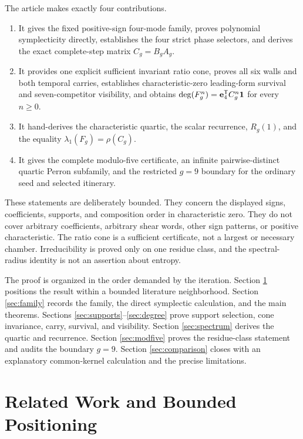 \documentclass[11pt]{article}
\theoremstyle{remark}
\numberwithin{equation}{section}
\begin{document}
The article makes exactly four contributions.
\begin{enumerate}[label=\textup{(\arabic*)}]
\item It gives the fixed positive-sign four-mode family, proves polynomial
symplecticity directly, establishes the four strict phase selectors, and
derives the exact complete-step matrix \(C_g=B_gA_g\).
\item It provides one explicit sufficient invariant ratio cone, proves all
six walls and both temporal carries, establishes characteristic-zero
leading-form survival and seven-competitor visibility, and obtains
\(\deg(F_g^n)=\mathbf{e}_4^{\mathsf{T}}C_g^n\mathbf{1}\) for every \(n\geq0\).
\item It hand-derives the characteristic quartic, the scalar recurrence,
\(R_g(1)\), and the equality \(\lambda_1(F_g)=\rho(C_g)\).
\item It gives the complete modulo-five certificate, an infinite
pairwise-distinct quartic Perron subfamily, and the restricted \(g=9\)
boundary for the ordinary seed and selected itinerary.
\end{enumerate}

These statements are deliberately bounded.  They concern the displayed
signs, coefficients, supports, and composition order in characteristic
zero.  They do not cover arbitrary coefficients, arbitrary shear words,
other sign patterns, or positive characteristic.  The ratio cone is a
sufficient certificate, not a largest or necessary chamber.  Irreducibility
is proved only on one residue class, and the spectral-radius identity is not
an assertion about entropy.

The proof is organized in the order demanded by the iteration.  Section
\ref{sec:related} positions the result within a bounded literature
neighborhood.  Section \ref{sec:family} records the family, the direct
symplectic calculation, and the main theorems.  Sections
\ref{sec:supports}--\ref{sec:degree} prove support selection, cone
invariance, carry, survival, and visibility.  Section \ref{sec:spectrum}
derives the quartic and recurrence.  Section \ref{sec:modfive} proves the
residue-class statement and audits the boundary \(g=9\).  Section
\ref{sec:comparison} closes with an explanatory common-kernel calculation
and the precise limitations.

\section{Related Work and Bounded Positioning}\label{sec:related}
\end{document}
